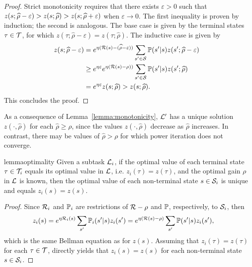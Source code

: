 \begin{proof}
Strict monotonicity requires that there exists $\varepsilon>0$ such that $\linebreak{z(s;\widehat\rho - \varepsilon) > z(s;\widehat\rho) > z(s;\widehat\rho+\varepsilon)}$ when $\varepsilon\rightarrow 0$. The first inequality is proven by induction; the second is analogous. The base case is given by the terminal states $\tau\in\mathcal{T}$, for which $z(\tau;\widehat\rho - \varepsilon) = z(\tau;\widehat\rho)$. The inductive case is given by
\begin{align*}
    z(s;\widehat\rho-\varepsilon) &= e^{\eta(\mathcal{R}(s) - (\widehat\rho -\varepsilon))}\sum_{s'\in\mathcal{S}}\mathbb{P}(s'\lvert s) z(s';\widehat\rho- \varepsilon)\\
      &\geq e^{\eta\varepsilon} e^{\eta(\mathcal{R}(s) - \rho))}\sum_{s'\in\mathcal{S}}\mathbb{P}(s'\lvert s) z(s';\widehat\rho)\\
      &= e^{\eta\varepsilon} z(s;\widehat\rho) > z(s;\widehat\rho).
\end{align*}
This concludes the proof.
\end{proof}

As a consequence of Lemma~\ref{lemma:monotonicity}, $\mathcal{L}'$ has a unique solution $z(\cdot,\widehat\rho)$ for each $\widehat\rho\geq\rho$, since the values $z(\cdot,\widehat\rho)$ decrease as $\widehat\rho$ increases. In contrast, there may be values of $\widehat\rho>\rho$ for which power iteration does not converge.

\begin{restatable}{lemma}{optimality}
Given a subtask $\mathcal{L}_i$, if the optimal value of each terminal state $\tau\in\mathcal{T}_i$ equals its optimal value in $\mathcal{L}$, i.e. $z_i(\tau) = z(\tau)$, and the optimal gain $\rho$ in $\mathcal{L}$ is known, then the optimal value of each non-terminal state $s\in\mathcal{S}_i$ is unique and equals $z_i(s)=z(s)$.
    \label{lemma:optimality}
\end{restatable}

\begin{proof} Since $\mathcal{R}_i$ and $\mathbb{P}_i$ are restrictions of $\mathcal{R}-\rho$ and $\mathbb{P}$, respectively, to $\mathcal{S}_i$, then
\begin{align*}
    z_i(s) &= e^{\eta\mathcal{R}_i(s)}\sum_{s'}\mathbb{P}_i(s'\lvert s) z_i(s') = e^{\eta(\mathcal{R}(s) - \rho)}\sum_{s'}\mathbb{P}(s'\lvert s) z_i(s'), \nonumber
\end{align*}
which is the same Bellman equation as for $z(s)$. Assuming that $z_i(\tau) = z(\tau)$ for each $\tau\in\mathcal{T}$, directly yields that $z_i(s)=z(s)$ for each non-terminal state $s\in\mathcal{S}_i$.
\end{proof}

